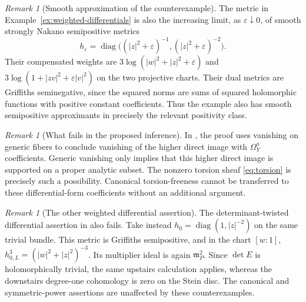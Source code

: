 \documentclass[11pt,reqno]{amsart}
\numberwithin{equation}{section}
\theoremstyle{definition}
\theoremstyle{remark}
\newtheorem{remark}[theorem]{Remark}
\begin{document}
\begin{remark}[Smooth approximation of the counterexample]
The metric in Example~\ref{ex:weighted-differentials} is also the increasing
limit, as $\varepsilon\downarrow0$, of smooth strongly Nakano
semipositive metrics
\[
 h_\varepsilon=\operatorname{diag}
 \bigl((|z|^2+\varepsilon)^{-1},(|z|^2+\varepsilon)^{-2}\bigr).
\]
Their compensated weights are
$3\log(|w|^2+|z|^2+\varepsilon)$ and
$3\log(1+|zv|^2+\varepsilon|v|^2)$ on the two projective charts.
Their dual metrics are Griffiths seminegative, since the squared norms
are sums of squared holomorphic functions with positive constant
coefficients. Thus the example also has smooth semipositive approximants
in precisely the relevant positivity class.
\end{remark}

\begin{remark}[What fails in the proposed inference]
In \cite[Lemma 3.10(ii)]{LLYZpre}, the proof uses vanishing
on generic fibers to conclude vanishing of the higher direct image
with $\Omega_Y^a$ coefficients. Generic vanishing only implies that
this higher direct image is supported on a proper analytic subset.
The nonzero torsion sheaf \eqref{eq:torsion} is precisely such a
possibility. Canonical torsion-freeness cannot be transferred to these
differential-form coefficients without an additional argument.
\end{remark}

\begin{remark}[The other weighted differential assertion]
The determinant-twisted differential assertion in
\cite[Theorem 1.6(ii)]{LLYZpre} also fails. Take instead
$h_0=\operatorname{diag}(1,|z|^{-2})$ on the same trivial bundle.
This metric is Griffiths semipositive, and in the chart $[w:1]$,
$h_{0,L}^3=(|w|^2+|z|^2)^{-3}$. Its multiplier ideal is again
$\mathfrak m_P^2$. Since $\det E$ is holomorphically trivial,
the same upstairs calculation applies, whereas the downstairs
degree-one cohomology is zero on the Stein disc.
The canonical and symmetric-power assertions are unaffected by these
counterexamples.
\end{remark}
\end{document}
